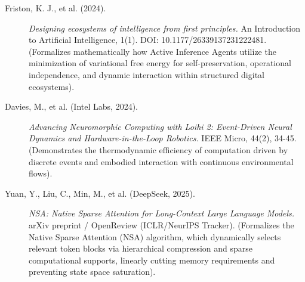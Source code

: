 \documentclass[11pt,a4paper,oneside]{article} %
\begin{document}
\hypertarget{a2.2-applicative-line-frontier-solutions-frontier-papers-2024-2026}{%
\label{a2.2-applicative-line-frontier-solutions-frontier-papers-2024-2026}}

\hypertarget{a1.1-active-inference-and-autonomous-agentic-ai}{%
\label{a1.1-active-inference-and-autonomous-agentic-ai}}

\begin{description}
\item[Friston, K. J., et al. (2024).] \emph{Designing ecosystems of intelligence from first principles.} An Introduction to Artificial Intelligence, 1(1). DOI: 10.1177/26339137231222481. (Formalizes mathematically how Active Inference Agents utilize the minimization of variational free energy for self-preservation, operational independence, and dynamic interaction within structured digital ecosystems).
\end{description}

\hypertarget{a1.2-neuromorphic-computing-and-event-driven-computation}{%
\label{a1.2-neuromorphic-computing-and-event-driven-computation}}

\begin{description}
\item[Davies, M., et al. (Intel Labs, 2024).] \emph{Advancing Neuromorphic Computing with Loihi 2: Event-Driven Neural Dynamics and Hardware-in-the-Loop Robotics.} IEEE Micro, 44(2), 34-45. (Demonstrates the thermodynamic efficiency of computation driven by discrete events and embodied interaction with continuous environmental flows).
\end{description}

\hypertarget{a1.3-sparse-dynamic-attention-and-intrinsic-reward}{%
\label{a1.3-sparse-dynamic-attention-and-intrinsic-reward}}

\begin{description}
\item[Yuan, Y., Liu, C., Min, M., et al. (DeepSeek, 2025).] \emph{NSA: Native Sparse Attention for Long-Context Large Language Models.} arXiv preprint / OpenReview (ICLR/NeurIPS Tracker). (Formalizes the Native Sparse Attention (NSA) algorithm, which dynamically selects relevant token blocks via hierarchical compression and sparse computational supports, linearly cutting memory requirements and preventing state space saturation).
\end{description}
\end{document}
